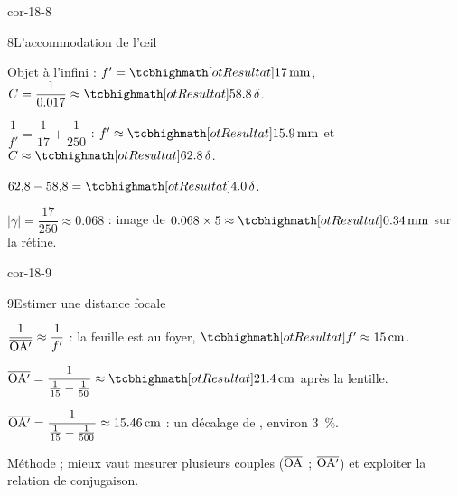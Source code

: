 \begin{blocLivre}{cor-18-8}
\begin{corrige}{8}{L'accommodation de l'œil}
\begin{questions}
\item Objet à l'infini : $f'=\res{\qty{17}{mm}}$, $C=\dfrac{1}{\num{0,017}}\approx\res{\num{58,8}\,\delta}$.
\item $\dfrac{1}{f'}=\dfrac{1}{17}+\dfrac{1}{250}$ : $f'\approx\res{\qty{15,9}{mm}}$ et $C\approx\res{\num{62,8}\,\delta}$.
\item $62{,}8-58{,}8=\res{\num{4,0}\,\delta}$.
\item $|\gamma|=\dfrac{17}{250}\approx\num{0,068}$ : image de $\num{0,068}\times5\approx\res{\qty{0,34}{mm}}$ sur la rétine.
\end{questions}
\end{corrige}
\end{blocLivre}
\begin{blocLivre}{cor-18-9}
\begin{corrige}{9}{Estimer une distance focale}
\begin{questions}
\item $\dfrac{1}{\overline{\mathrm{OA'}}}\approx\dfrac{1}{f'}$ : la feuille est au foyer, $\res{f'\approx\qty{15}{cm}}$.
\item $\alg{OA'}=\dfrac{1}{\frac{1}{15}-\frac{1}{50}}\approx\res{\qty{21,4}{cm}}$ après la lentille.
\item $\overline{\mathrm{OA'}}=\dfrac{1}{\frac{1}{15}-\frac{1}{500}}\approx\qty{15,46}{cm}$ : un décalage de , environ \qty{3}{\percent}.
\item Méthode  ; mieux vaut mesurer plusieurs couples ($\overline{\mathrm{OA}}$ ; $\overline{\mathrm{OA'}}$) et exploiter la relation de conjugaison.
\end{questions}
\end{corrige}
\end{blocLivre}
